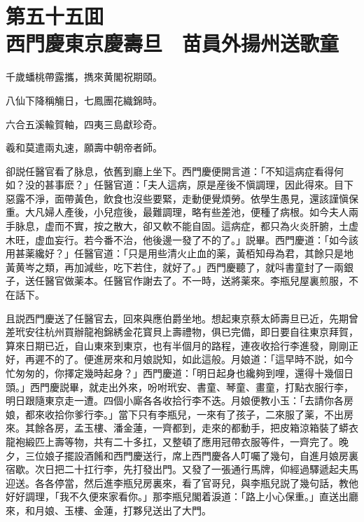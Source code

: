 
\chapter*{第五十五囬　\\西門慶東京慶壽旦　苗員外揚州送歌童}


\begin{myquote}
千歲蟠桃帶露攜，擕來黄閣祝期頤。

八仙下降稱觴日，七鳳團花織錦時。

六合五溪輸賀軸，四夷三島獻珍奇。

羲和莫遣兩丸速，願壽中朝帝者師。
\end{myquote}

卻説任醫官看了脉息，依舊到廳上坐下。西門慶便開言道：「不知這病症看得何如？没的甚事麽？」任醫官道：「夫人這病，原是産後不愼調理，因此得來。目下惡露不淨，面帶黃色，飲食也沒些要緊，走動便覺煩勞。依學生愚見，還該謹愼保重。大凡婦人產後，小兒痘後，最難調理，略有些差池，便種了病根。如今夫人兩手脉息，虚而不實，按之散大，卻又軟不能自固。這病症，都只為火炎肝腑，土虚木旺，虚血妄行。若今番不治，他後邊一發了不的了。」説畢。西門慶道：「如今該用甚薬纔好？」任醫官道：「只是用些清火止血的薬，黃栢知母為君，其餘只是地黃黄岑之類，再加減些，吃下若住，就好了。」西門慶聽了，就呌書童封了一兩銀子，送任醫官做薬本。任醫官作謝去了。不一時，送將薬來。李瓶兒屋裏煎服，不在話下。

且説西門慶送了任醫官去，回來與應伯爵坐地。想起東京蔡太師壽旦已近，先期曾差玳安往杭州買辦龍袍錦綉金花寳貝上壽禮物，俱已完備，即日要自往東京拜賀，算來日期已近，自山東來到東京，也有半個月的路程，連夜收拾行李進發，剛剛正好，再遲不的了。便進房來和月娘説知，如此這般。月娘道：「這早時不説，如今忙匆匆的，你擇定幾時起身？」西門慶道：「明日起身也纔夠到哩，還得十幾個日頭。」西門慶説畢，就走出外來，吩咐玳安、書童、琴童、畫童，打點衣服行李，明日跟隨東京走一遭。四個小廝各各收拾行李不迭。月娘便教小玉：「去請你各房娘，都來收拾你爹行李。」當下只有李瓶兒，一來有了孩子，二來服了薬，不出房來。其餘各房，孟玉樓、潘金蓮，一齊都到，走來的都動手，把皮箱涼箱裝了蟒衣龍袍緞匹上壽等物，共有二十多扛，又整頓了應用冠帶衣服等件，一齊完了。晚夕，三位娘子擺設酒餚和西門慶送行，席上西門慶各人叮囑了幾句，自進月娘房裏宿歇。次日把二十扛行李，先打發出門。又發了一張通行馬牌，仰經過驛遞起夫馬迎送。各各停當，然后進李瓶兒房裏來，看了官哥兒，與李瓶兒説了幾句話，教他好好調理，「我不久便來家看你。」那李瓶兒閣着淚道：「路上小心保重。」直送出廳來，和月娘、玉樓、金蓮，打夥兒送出了大門。

